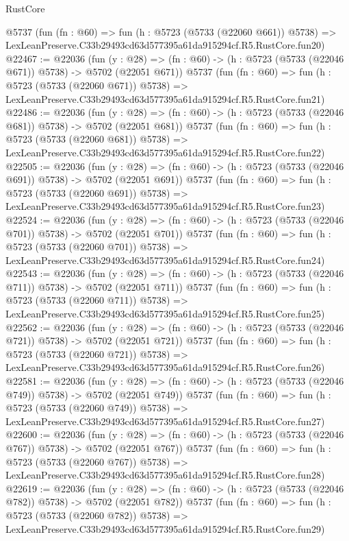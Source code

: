 \begin{lexlean}{RustCore}
\begin{coremodule}
    @5737
    (fun (fn : @60) =>
    fun (h : @5723 (@5733 (@22060 @661)) @5738) =>
    LexLeanPreserve.C33b29493cd63d577395a61da915294cf.R5.RustCore.fun20)
@22467 := @22036
    (fun (y : @28) => (fn : @60) -> (h : @5723 (@5733 (@22046 @671)) @5738) -> @5702 (@22051 @671))
    @5737
    (fun (fn : @60) =>
    fun (h : @5723 (@5733 (@22060 @671)) @5738) =>
    LexLeanPreserve.C33b29493cd63d577395a61da915294cf.R5.RustCore.fun21)
@22486 := @22036
    (fun (y : @28) => (fn : @60) -> (h : @5723 (@5733 (@22046 @681)) @5738) -> @5702 (@22051 @681))
    @5737
    (fun (fn : @60) =>
    fun (h : @5723 (@5733 (@22060 @681)) @5738) =>
    LexLeanPreserve.C33b29493cd63d577395a61da915294cf.R5.RustCore.fun22)
@22505 := @22036
    (fun (y : @28) => (fn : @60) -> (h : @5723 (@5733 (@22046 @691)) @5738) -> @5702 (@22051 @691))
    @5737
    (fun (fn : @60) =>
    fun (h : @5723 (@5733 (@22060 @691)) @5738) =>
    LexLeanPreserve.C33b29493cd63d577395a61da915294cf.R5.RustCore.fun23)
@22524 := @22036
    (fun (y : @28) => (fn : @60) -> (h : @5723 (@5733 (@22046 @701)) @5738) -> @5702 (@22051 @701))
    @5737
    (fun (fn : @60) =>
    fun (h : @5723 (@5733 (@22060 @701)) @5738) =>
    LexLeanPreserve.C33b29493cd63d577395a61da915294cf.R5.RustCore.fun24)
@22543 := @22036
    (fun (y : @28) => (fn : @60) -> (h : @5723 (@5733 (@22046 @711)) @5738) -> @5702 (@22051 @711))
    @5737
    (fun (fn : @60) =>
    fun (h : @5723 (@5733 (@22060 @711)) @5738) =>
    LexLeanPreserve.C33b29493cd63d577395a61da915294cf.R5.RustCore.fun25)
@22562 := @22036
    (fun (y : @28) => (fn : @60) -> (h : @5723 (@5733 (@22046 @721)) @5738) -> @5702 (@22051 @721))
    @5737
    (fun (fn : @60) =>
    fun (h : @5723 (@5733 (@22060 @721)) @5738) =>
    LexLeanPreserve.C33b29493cd63d577395a61da915294cf.R5.RustCore.fun26)
@22581 := @22036
    (fun (y : @28) => (fn : @60) -> (h : @5723 (@5733 (@22046 @749)) @5738) -> @5702 (@22051 @749))
    @5737
    (fun (fn : @60) =>
    fun (h : @5723 (@5733 (@22060 @749)) @5738) =>
    LexLeanPreserve.C33b29493cd63d577395a61da915294cf.R5.RustCore.fun27)
@22600 := @22036
    (fun (y : @28) => (fn : @60) -> (h : @5723 (@5733 (@22046 @767)) @5738) -> @5702 (@22051 @767))
    @5737
    (fun (fn : @60) =>
    fun (h : @5723 (@5733 (@22060 @767)) @5738) =>
    LexLeanPreserve.C33b29493cd63d577395a61da915294cf.R5.RustCore.fun28)
@22619 := @22036
    (fun (y : @28) => (fn : @60) -> (h : @5723 (@5733 (@22046 @782)) @5738) -> @5702 (@22051 @782))
    @5737
    (fun (fn : @60) =>
    fun (h : @5723 (@5733 (@22060 @782)) @5738) =>
    LexLeanPreserve.C33b29493cd63d577395a61da915294cf.R5.RustCore.fun29)

\end{coremodule}
\end{lexlean}
